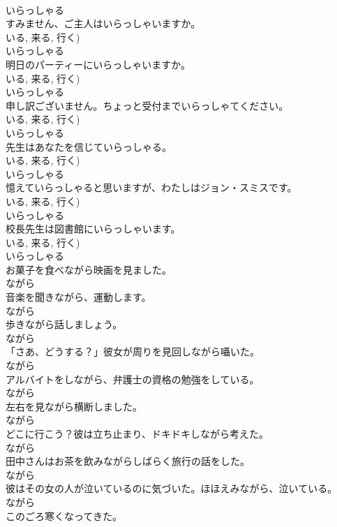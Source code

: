 \documentclass[8pt]{extreport}
\begin{document}
\begin{CJK}{UTF8}{min}
\\	いらっしゃる
\\	すみません、ご主人はいらっしゃいますか。	
\\	いる, 来る, 行く)	
\\	いらっしゃる
\\	明日のパーティーにいらっしゃいますか。	
\\	いる, 来る, 行く)	
\\	いらっしゃる
\\	申し訳ございません。ちょっと受付までいらっしゃてください。	
\\	いる, 来る, 行く)	
\\	いらっしゃる
\\	先生はあなたを信じていらっしゃる。	
\\	いる, 来る, 行く)	
\\	いらっしゃる
\\	憶えていらっしゃると思いますが、わたしはジョン・スミスです。	
\\	いる, 来る, 行く)	
\\	いらっしゃる
\\	校長先生は図書館にいらっしゃいます。	
\\	いる, 来る, 行く)	
\\	いらっしゃる
\\	お菓子を食べながら映画を見ました。	
\\	ながら
\\	音楽を聞きながら、運動します。	
\\	ながら
\\	歩きながら話しましょう。	
\\	ながら
\\	「さあ、どうする？」彼女が周りを見回しながら囁いた。	
\\	ながら
\\	アルバイトをしながら、弁護士の資格の勉強をしている。	
\\	ながら
\\	左右を見ながら横断しました。	
\\	ながら
\\	どこに行こう？彼は立ち止まり、ドキドキしながら考えた。	
\\	ながら
\\	田中さんはお茶を飲みながらしばらく旅行の話をした。	
\\	ながら
\\	彼はその女の人が泣いているのに気づいた。ほほえみながら、泣いている。	
\\	ながら
\\	このごろ寒くなってきた。	

\end{CJK}
\end{document}
